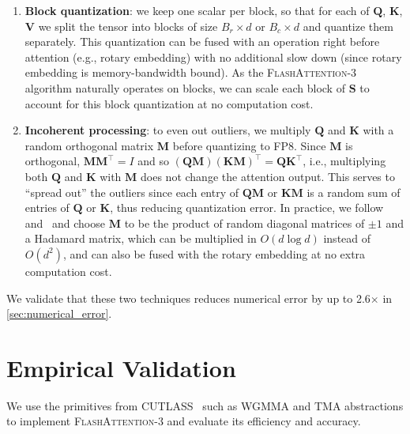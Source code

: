 \begin{enumerate}

\item \textbf{Block quantization}: we keep one scalar per block, so that for each of $\mathbf{Q}$, $\mathbf{K}$, $\mathbf{V}$ we split the tensor into blocks of size $B_r \times d$ or $B_c \times d$ and quantize them separately. This quantization can be fused with an operation right before attention (e.g., rotary embedding) with no additional slow down (since rotary embedding is memory-bandwidth bound). As the \textsc{FlashAttention-3} algorithm naturally operates on blocks, we can scale each block of
  $\mathbf{S}$ to account for this block quantization at no computation cost.
\item \textbf{Incoherent processing}: to even out outliers, we multiply
  $\mathbf{Q}$ and $\mathbf{K}$ with a random orthogonal matrix $\mathbf{M}$ before quantizing to FP8. Since $\mathbf{M}$ is orthogonal, $\mathbf{M} \mathbf{M}^\top = I$ and so $(\mathbf{Q} \mathbf{M}) (\mathbf{K}
  \mathbf{M})^\top = \mathbf{Q} \mathbf{K}^\top$, i.e., multiplying both $\mathbf{Q}$ and $\mathbf{K}$ with
  $\mathbf{M}$ does not change the attention output. This serves to ``spread out'' the outliers since each entry of $\mathbf{Q} \mathbf{M}$
  or $\mathbf{K} \mathbf{M}$ is a random sum of entries of $\mathbf{Q}$ or $\mathbf{K}$, thus reducing quantization error. In practice, we follow \citet{chee2024quip} and~\citet{tseng2024quip} and choose $\mathbf{M}$ to be the product of random diagonal matrices of $\pm
  1$ and a Hadamard matrix, which can be multiplied in $O(d \log d)$ instead of $O(d^2)$, and can also be fused with the rotary embedding at no extra computation cost.
\end{enumerate}

We validate that these two techniques reduces numerical error by up to 2.6$\times$ in \cref{sec:numerical_error}.

\section{Empirical Validation}
\label{sec:exp}

We use the primitives from CUTLASS~\citep{Thakkar_CUTLASS_2023} such as WGMMA and TMA abstractions to implement \textsc{FlashAttention-3} and evaluate its efficiency and accuracy.

